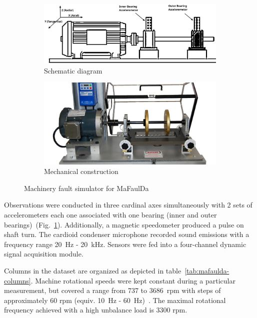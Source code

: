 \begin{figure}[h]
\centering
\begin{subfigure}[b]{0.48\textwidth}
	\includegraphics[width=\textwidth]{assets/analysis/mafaulda-simulator.png}
	\caption{Schematic diagram \cite{pestana-viana_influence_2016}}
\end{subfigure}
\hfill
\begin{subfigure}[b]{0.48\textwidth}
	\includegraphics[width=\textwidth]{assets/analysis/machinery-fault-simulator.jpg}
	\caption{Mechanical construction \cite{noauthor_spectraquest_nodate}}
\end{subfigure}
\caption{Machinery fault simulator for MaFaulDa}
\label{fig:mafaulda-simulator}
\end{figure}

Observations were conducted in three cardinal axes simultaneously with 2 sets of accelerometers each one associated with one bearing (inner and outer bearings)~(Fig.~\ref{fig:mafaulda-simulator}). Additionally, a magnetic speedometer produced a pulse on shaft turn. The cardioid condenser microphone recorded sound emissions with a frequency range 20~Hz - 20~kHz. Sensors were fed into a four-channel dynamic signal acquisition module. 

Columns in the dataset are organized as depicted in table~\ref{tab:mafaulda-columns}. Machine rotational speeds were kept constant during a particular measurement, but covered a range from 737 to 3686~rpm with steps of approximately 60 rpm (equiv. 10~Hz - 60~Hz)~\cite{pestana-viana_influence_2016}. The maximal rotational frequency achieved with a high unbalance load is 3300 rpm.

